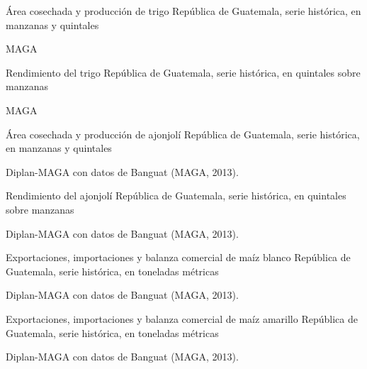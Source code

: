 
%
{%
}%
{%
	Área cosechada y producción de trigo} %
{%
	República de Guatemala, serie histórica, en manzanas y  quintales } %
{%
	\begin{tikzpicture}[x=1pt,y=1pt]    \end{tikzpicture}}%
{%
	MAGA} %



%
{%
}%
{%
	Rendimiento del trigo} %
{%
	República de Guatemala, serie histórica, en quintales sobre manzanas } %
{%
	\begin{tikzpicture}[x=1pt,y=1pt]    \end{tikzpicture}}%
{%
	MAGA } %


%
{%
}%
{%
	Área cosechada y producción de ajonjolí} %
{%
	República de Guatemala, serie histórica, en manzanas y  quintales } %
{%
	\begin{tikzpicture}[x=1pt,y=1pt]    \end{tikzpicture}}%
{%
	Diplan-MAGA con datos de Banguat (MAGA, 2013).} %



%
{%
}%
{%
	Rendimiento del ajonjolí} %
{%
	República de Guatemala, serie histórica, en quintales sobre manzanas } %
{%
	\begin{tikzpicture}[x=1pt,y=1pt]    \end{tikzpicture}}%
{%
	Diplan-MAGA con datos de Banguat (MAGA, 2013).} %



%
{%
}%
{%
	Exportaciones, importaciones y balanza comercial de maíz blanco} %
{%
	República de Guatemala, serie histórica, en toneladas métricas } %
{%
	\begin{tikzpicture}[x=1pt,y=1pt]    \end{tikzpicture}}%
{%
	Diplan-MAGA con datos de Banguat (MAGA, 2013).} %



%
{%
}%
{%
	Exportaciones, importaciones y balanza comercial de maíz amarillo} %
{%
	República de Guatemala, serie histórica, en toneladas métricas } %
{%
	\begin{tikzpicture}[x=1pt,y=1pt]    \end{tikzpicture}}%
{%
	Diplan-MAGA con datos de Banguat (MAGA, 2013).} %



